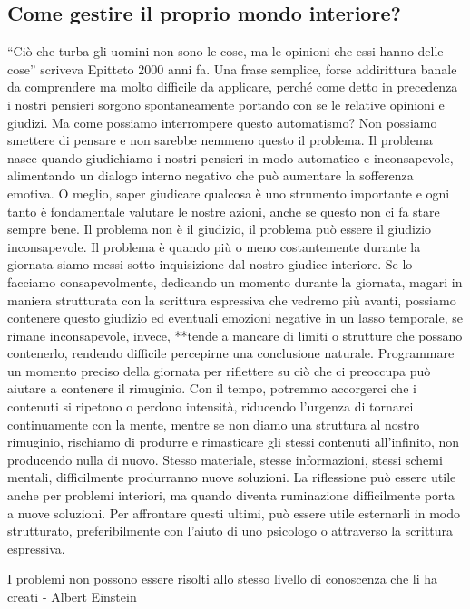 \documentclass[12pt]{book} %
\begin{document}
\subsection{Come gestire il proprio mondo interiore?}
“Ciò che turba gli uomini non sono le cose, ma le opinioni che essi hanno delle cose” scriveva Epitteto 2000 anni fa.
Una frase semplice, forse addirittura banale da comprendere ma molto difficile da applicare, perché come detto in precedenza i
nostri pensieri sorgono spontaneamente portando con se le relative opinioni e giudizi. Ma come possiamo interrompere
questo automatismo? Non possiamo smettere di pensare e non sarebbe nemmeno questo il problema. 
Il problema nasce quando giudichiamo i nostri pensieri in modo automatico e inconsapevole, alimentando un dialogo interno negativo che può aumentare la sofferenza emotiva. O meglio, saper giudicare qualcosa è uno strumento importante e ogni tanto è
fondamentale valutare le nostre azioni, anche se questo non ci fa stare sempre bene. Il problema non è il giudizio, il
problema può essere il giudizio inconsapevole. Il problema è quando più o meno costantemente durante la giornata siamo messi
sotto inquisizione dal nostro giudice interiore. Se lo facciamo consapevolmente, dedicando un momento durante la
giornata, magari in maniera strutturata con la scrittura espressiva che vedremo più avanti, possiamo contenere questo
giudizio ed eventuali emozioni negative in un lasso temporale, se rimane inconsapevole, invece, **tende a mancare di limiti o strutture che possano contenerlo, rendendo difficile percepirne una conclusione naturale. Programmare un momento preciso della giornata per riflettere su ciò che ci preoccupa può aiutare a contenere il rimuginio. Con il tempo, potremmo accorgerci che i contenuti si ripetono o perdono intensità, riducendo l’urgenza di tornarci continuamente con la mente, mentre se non diamo una struttura al nostro rimuginio, rischiamo di produrre
e rimasticare gli stessi contenuti all'infinito, non producendo nulla di nuovo. Stesso materiale,
stesse informazioni, stessi schemi mentali, difficilmente produrranno nuove soluzioni. 
La riflessione può essere utile anche per problemi interiori, ma quando diventa ruminazione difficilmente porta a nuove soluzioni. Per affrontare questi ultimi, può essere utile esternarli in modo strutturato, preferibilmente con l’aiuto di uno psicologo o attraverso la scrittura espressiva.

I problemi non possono essere risolti allo stesso livello di conoscenza che li ha creati - Albert Einstein
\end{document}
